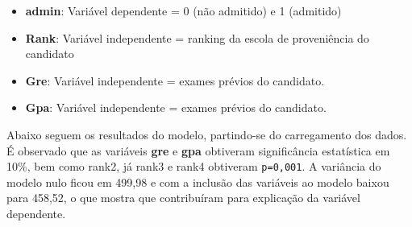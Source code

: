 \documentclass[12pt,brazil,oneside]{book}
\newenvironment{Shaded}{\begin{snugshade}}{\end{snugshade}}
\newcommand{\CommentTok}[1]{\textcolor[rgb]{0.56,0.35,0.01}{\textit{#1}}}
\newcommand{\DataTypeTok}[1]{\textcolor[rgb]{0.13,0.29,0.53}{#1}}
\newcommand{\KeywordTok}[1]{\textcolor[rgb]{0.13,0.29,0.53}{\textbf{#1}}}
\newcommand{\NormalTok}[1]{#1}
\newcommand{\OperatorTok}[1]{\textcolor[rgb]{0.81,0.36,0.00}{\textbf{#1}}}
\newcommand{\StringTok}[1]{\textcolor[rgb]{0.31,0.60,0.02}{#1}}
\providecommand{\tightlist}{%
  \setlength{\itemsep}{0pt}\setlength{\parskip}{0pt}}
\begin{document}
\begin{itemize}
\tightlist
\item
  \textbf{admin}: Variável dependente = 0 (não admitido) e 1 (admitido)
\item
  \textbf{Rank}: Variável independente = ranking da escola de proveniência do candidato
\item
  \textbf{Gre}: Variável independente = exames prévios do candidato.
\item
  \textbf{Gpa}: Variável independente = exames prévios do candidato.
\end{itemize}

Abaixo seguem os resultados do modelo, partindo-se do carregamento dos dados. É observado que as variáveis \textbf{gre} e \textbf{gpa} obtiveram significância estatística em 10\%, bem como rank2, já rank3 e rank4 obtiveram \texttt{p=0,001}. A variância do modelo nulo
ficou em 499,98 e com a inclusão das variáveis ao modelo baixou para 458,52, o que mostra que contribuíram para explicação da variável dependente.

\begin{Shaded}
\end{Shaded}
\end{document}
